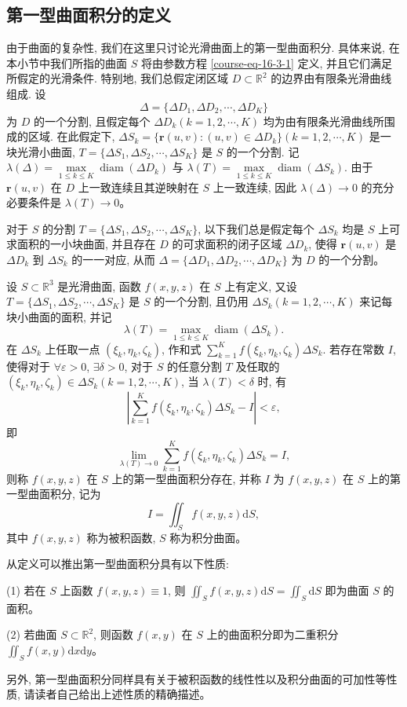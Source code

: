 \documentclass[UTF8,12pt,a4paper,fontset=fandol]{ctexart}
\begin{document}
\subsection{第一型曲面积分的定义}

由于曲面的复杂性, 我们在这里只讨论光滑曲面上的第一型曲面积分. 具体来说, 在本小节中我们所指的曲面 $S$ 将由参数方程 \eqref{course-eq-16-3-1}  定义, 并且它们满足所假定的光滑条件. 特别地, 我们总假定闭区域 $D\subset\mathbb R^2$ 的边界由有限条光滑曲线组成. 设
\[
  \Delta=\{\Delta D_1,\Delta D_2,\cdots,\Delta D_K\}
\]
为 $D$ 的一个分割, 且假定每个 $\Delta D_k(k=1,2,\cdots,K)$ 均为由有限条光滑曲线所围成的区域. 在此假定下, $\Delta S_k=\{\boldsymbol r(u,v):(u,v)\in\Delta D_k\}(k=1,2,\cdots,K)$ 是一块光滑小曲面, $T=\{\Delta S_1,\Delta S_2,\cdots,\Delta S_K\}$ 是 $S$ 的一个分割. 记 $\lambda(\Delta)=\max\limits_{1\leqslant k\leqslant K}\operatorname{diam}(\Delta D_k)$ 与 $\lambda(T)=\max\limits_{1\leqslant k\leqslant K}\operatorname{diam}(\Delta S_k)$. 由于 $\boldsymbol r(u,v)$ 在 $D$ 上一致连续且其逆映射在 $S$ 上一致连续, 因此 $\lambda(\Delta)\to0$ 的充分必要条件是 $\lambda(T)\to0$。

对于 $S$ 的分割 $T=\{\Delta S_1,\Delta S_2,\cdots,\Delta S_K\}$, 以下我们总是假定每个 $\Delta S_k$ 均是 $S$ 上可求面积的一小块曲面, 并且存在 $D$ 的可求面积的闭子区域 $\Delta D_k$, 使得 $\boldsymbol r(u,v)$ 是 $\Delta D_k$ 到 $\Delta S_k$ 的一一对应, 从而 $\Delta=\{\Delta D_1,\Delta D_2,\cdots,\Delta D_K\}$ 为 $D$ 的一个分割。

\begin{definition}\label{course-definition-16-3-1}\quad 设 $S\subset\mathbb R^3$ 是光滑曲面, 函数 $f(x,y,z)$ 在 $S$ 上有定义, 又设\allowbreak $T=\{\Delta S_1,\Delta S_2,\cdots,\Delta S_K\}$ 是 $S$ 的一个分割, 且仍用 $\Delta S_k(k=1,2,\cdots,K)$ 来记每块小曲面的面积, 并记
\[
  \lambda(T)=\max_{1\leqslant k\leqslant K}\operatorname{diam}(\Delta S_k).
\]
在 $\Delta S_k$ 上任取一点 $(\xi_k,\eta_k,\zeta_k)$, 作和式 $\sum\limits_{k=1}^K f(\xi_k,\eta_k,\zeta_k)\Delta S_k$. 若存在常数 $I$, 使得对于 $\forall\varepsilon>0$, $\exists\delta>0$, 对于 $S$ 的任意分割 $T$ 及任取的 $(\xi_k,\eta_k,\zeta_k)\in\Delta S_k(k=1,2,\cdots,K)$, 当 $\lambda(T)<\delta$ 时, 有
\[
  \left|\sum_{k=1}^K f(\xi_k,\eta_k,\zeta_k)\Delta S_k-I\right|<\varepsilon,
\]
即
\[
  \lim_{\lambda(T)\to0}\sum_{k=1}^K f(\xi_k,\eta_k,\zeta_k)\Delta S_k=I,
\]
则称 $f(x,y,z)$ 在 $S$ 上的第一型曲面积分存在, 并称 $I$ 为 $f(x,y,z)$ 在 $S$ 上的第一型曲面积分, 记为
\[
  I=\iint_S f(x,y,z)\mathrm dS,
\]
其中 $f(x,y,z)$ 称为被积函数, $S$ 称为积分曲面。

从定义可以推出第一型曲面积分具有以下性质:

(1) 若在 $S$ 上函数 $f(x,y,z)\equiv1$, 则 $\iint_S f(x,y,z)\mathrm dS=\iint_S\mathrm dS$ 即为曲面 $S$ 的面积。

(2) 若曲面 $S\subset\mathbb R^2$, 则函数 $f(x,y)$ 在 $S$ 上的曲面积分即为二重积分 $\iint_S f(x,y)\mathrm dx\mathrm dy$。

另外, 第一型曲面积分同样具有关于被积函数的线性性以及积分曲面的可加性等性质, 请读者自己给出上述性质的精确描述。

\end{definition}
\end{document}
